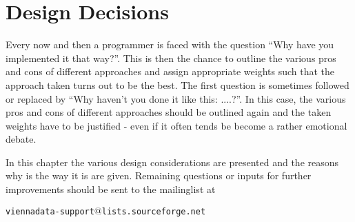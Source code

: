 \chapter{Design Decisions} \label{chap:design}

Every now and then a programmer is faced with the question ``Why have you implemented it that way?''.
This is then the chance to outline the various pros and cons of different approaches and assign appropriate weights such that the approach taken turns out to be the best.
The first question is sometimes followed or replaced by ``Why haven't you done it like this: ....?''.
In this case, the various pros and cons of different approaches should be outlined again and the taken weights have to be justified - even if it often tends be become a rather emotional debate.

In this chapter the various design considerations are presented and the reasons why {\ViennaData} is the way it is are given.
Remaining questions or inputs for further improvements should be sent to the mailinglist at
\begin{center}
\texttt{viennadata-support$@$lists.sourceforge.net} 
\end{center}


